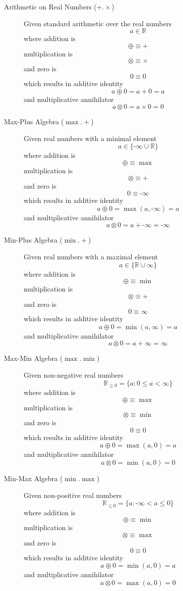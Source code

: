 \begin{description}

\item[Arithmetic on Real Numbers (${+}.{\times}$)] Given standard arithmetic over the real numbers
$$
  a \in \mathbb{R}
$$
where addition is
$$
  \oplus \equiv +
$$
multiplication is
$$
  \otimes \equiv \times
$$
and zero is
$$
  0 \equiv 0
$$
which results in additive identity
$$
  a \oplus 0  =  a + 0 = a
$$
and multiplicative annihilator
$$
  a \otimes 0 = a \times 0 = 0
$$

\item[Max-Plus Algebra (${\max}.{+}$)] Given real numbers with a minimal element
$$
  a \in \{\text{-}\infty \cup \mathbb{R}\}
$$
where addition is
$$
  \oplus \equiv \max
$$
multiplication is
$$
  \otimes \equiv +
$$
and zero is
$$
  0 \equiv \text{-}\infty
$$
which results in additive identity
$$
  a \oplus 0  =  \max(a,\text{-}\infty) = a
$$
and multiplicative annihilator
$$
  a \otimes 0 = a + \text{-}\infty = \text{-}\infty
$$

\item[Min-Plus Algebra (${\min}.{+}$)] Given real numbers with a maximal element
$$
  a \in \{\mathbb{R} \cup \infty\}
$$
where addition is
$$
  \oplus \equiv \min
$$
multiplication is
$$
  \otimes \equiv +
$$
and zero is
$$
  0 \equiv \infty
$$
which results in additive identity
$$
  a \oplus 0  =  \min(a,\infty) = a
$$
and multiplicative annihilator
$$
  a \otimes 0 = a + \infty = \infty
$$


\item[Max-Min Algebra (${\max}.{\min}$)] Given non-negative real numbers
$$
  \mathbb{R}_{\geq 0} = \{a : 0 \leq a < \infty\}
$$
where addition is
$$
  \oplus \equiv \max
$$
multiplication is
$$
  \otimes \equiv \min
$$
and zero is
$$
  0 \equiv 0
$$
which results in additive identity
$$
  a \oplus 0  =  \max(a,0) = a
$$
and multiplicative annihilator
$$
  a \otimes 0 = \min(a,0) = 0
$$

\item[Min-Max Algebra (${\min}.{\max}$)] Given non-positive real numbers
$$
  \mathbb{R}_{\leq 0} = \{a : \text{-}\infty < a \leq 0\}
$$
where addition is
$$
  \oplus \equiv \min
$$
multiplication is
$$
  \otimes \equiv \max
$$
and zero is
$$
  0 \equiv 0
$$
which results in additive identity
$$
  a \oplus 0  =  \min(a,0) = a
$$
and multiplicative annihilator
$$
  a \otimes 0 = \max(a,0) = 0
$$


\end{description}
